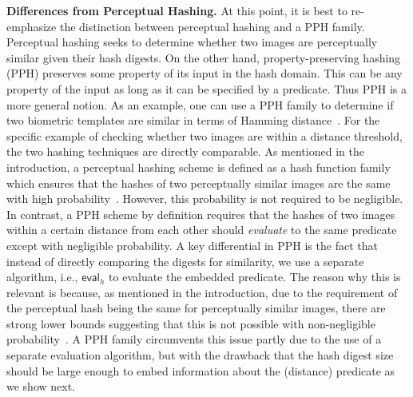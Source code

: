 \documentclass[pdflatex,sn-mathphys-num]{sn-jnl}
\newcommand{\descr}[1]{\vspace{0.2cm} \noindent \textbf{#1}}
\theoremstyle{definition}
\begin{document}
\descr{Differences from Perceptual Hashing.} At this point, it is best to re-emphasize the distinction between perceptual hashing and a PPH family. Perceptual hashing seeks to determine whether two images are perceptually similar given their hash digests. On the other hand, property-preserving hashing (PPH)  preserves some property of its input in the hash domain. This can be any property of the input as long as it can be specified by a predicate. Thus PPH is a more general notion. As an example, one can use a PPH family to determine if two biometric templates are similar in terms of Hamming distance~\cite{boyle2018adversarially}. For the specific example of checking whether two images are within a distance threshold, the two hashing techniques are directly comparable. As mentioned in the introduction, a perceptual hashing scheme is defined as a hash function family which ensures that the hashes of two perceptually similar images are the same with high probability~\cite{zauner2010ph-thesis, hao2021pph-attack, holmgren2022nearly}. However, this probability is not required to be negligible. In contrast, a PPH scheme by definition requires that the hashes of two images within a certain distance from each other should \emph{evaluate} to the same predicate except with negligible probability. A key differential in PPH is the fact that instead of directly comparing the digests for similarity, we use a separate algorithm, i.e., $\mathsf{eval}_h$ to evaluate the embedded predicate. The reason why this is relevant is because, as mentioned in the introduction, due to the requirement of the perceptual hash being the same for perceptually similar images, there are strong lower bounds suggesting that this is not possible with non-negligible probability~\cite{o2014lowerbound-ph, holmgren2022nearly}. A PPH family circumvents this issue partly due to the use of a separate evaluation algorithm, but with the drawback that the hash digest size should be large enough to embed information about the (distance) predicate as we show next. 
\end{document}
